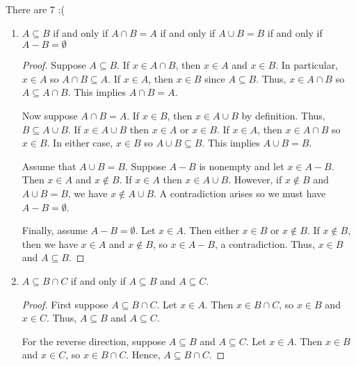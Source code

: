 \documentclass[class=report, crop=false]{standalone}
\begin{document}
  \begin{solution}
    There are 7 :(
    \begin{enumerate}[label=({\alph*})]
      \item \(A \subseteq B\) if and only if \(A \cap B = A\) if and only if \(A \cup B = B\) if and only if \(A - B = \emptyset\)

      \begin{proof}
        Suppose \(A \subseteq B\). If \(x \in A \cap B\), then \(x \in A\) and \(x \in B\). In particular, \(x \in A\) so \(A \cap B \subseteq A\).
        If \(x \in A\), then \(x \in B\) since \(A \subseteq B\). Thus, \(x \in A \cap B\) so \(A \subseteq A \cap B\). This implies \(A \cap B = A\).

        Now suppose \(A \cap B = A\). If \(x \in B\), then \(x \in A \cup B\) by definition. Thus, \(B \subseteq A \cup B\).
        If \(x \in A \cup B\) then \(x \in A\) or \(x \in B\). If \(x \in A\), then \(x \in A \cap B\) so \(x \in B\).
        In either case, \(x \in B\) so \(A \cup B \subseteq B\). This implies \(A \cup B = B\).

        Assume that \(A \cup B = B\). Suppose \(A - B\) is nonempty and let \(x \in A - B\). Then \(x \in A\) and \(x \notin B\).
        If \(x \in A\) then \(x \in A \cup B\). However, if \(x \notin B\) and \(A \cup B = B\), we have \(x \notin A \cup B\).
        A contradiction arises so we must have \(A - B = \emptyset\).

        Finally, assume \(A - B = \emptyset\). Let \(x \in A\). Then either \(x \in B\) or \(x \notin B\).
        If \(x \notin B\), then we have \(x \in A\) and \(x \notin B\), so \(x \in A - B\), a contradiction.
        Thus, \(x \in B\) and \(A \subseteq B\).
      \end{proof}

      \item \(A \subseteq B \cap C\) if and only if \(A \subseteq B\) and \(A \subseteq C\).

      \begin{proof}
        First suppose \(A \subseteq B \cap C\). Let \(x \in A\). Then \(x \in B \cap C\), so \(x \in B\) and \(x \in C\). Thus, \(A \subseteq B\) and \(A \subseteq C\).

        For the reverse direction, suppose \(A \subseteq B\) and \(A \subseteq C\). Let \(x \in A\). Then \(x \in B\) and \(x \in C\), so \(x \in B \cap C\). Hence, \(A \subseteq B \cap C\).
      \end{proof}


\end{enumerate}
\end{solution}
\end{document}
